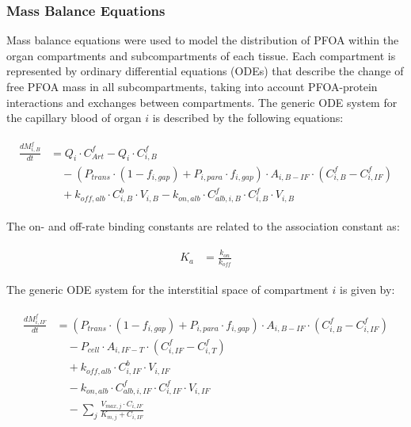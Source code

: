 \documentclass[preprint,12pt,authoryear]{elsarticle}
\begin{document}
\subsubsection{Mass Balance Equations}
Mass balance equations were used to model the distribution of PFOA within the organ compartments and subcompartments of each tissue. Each compartment is represented by ordinary differential equations (ODEs) that describe the change of free PFOA mass in all subcompartments, taking into account PFOA-protein interactions and exchanges between compartments. The generic ODE system for the capillary blood of organ $i$ is described by the following equations:

\begin{align}
\begin{aligned}
\frac{dM_{i,B}^f}{dt} &= Q_i \cdot C_{Art}^f 
- Q_i \cdot C_{i,B}^f \\
& \quad - (P_{trans}\cdot  (1-f_{i,gap}) + P_{i,para} \cdot f_{i,gap})  \cdot A_{i,B-IF} \cdot (C_{i,B}^f - C_{i,IF}^f) \\
& \quad + k_{off,alb} \cdot C_{i,B}^b \cdot V_{i,B} 
- k_{on,alb} \cdot C_{alb,i,B}^f \cdot C_{i,B}^f \cdot V_{i,B}
\end{aligned}
\label{eq:PFOA_blood_ODE_free_main}
\end{align}


The on- and off-rate binding constants are related to the association constant as:

\begin{align}
\begin{aligned}
K_a &= \frac{k_{on}}{k_{off}}
\end{aligned}
\label{eq:PFOA_association_constant_main}
\end{align}

The generic ODE system for the interstitial space of compartment $i$ is given by:

\begin{align}
\begin{aligned}
\frac{dM_{i,IF}^f}{dt} &= (P_{trans}\cdot  (1-f_{i,gap}) + P_{i,para} \cdot f_{i,gap}) \cdot A_{i,B-IF} \cdot (C_{i,B}^f - C_{i,IF}^f) \\ 
& \quad -  P_{cell} \cdot A_{i,IF-T} \cdot (C_{i,IF}^f - C_{i,T}^f) \\
& \quad + k_{off,alb} \cdot C_{i,IF}^b \cdot V_{i,IF} \\
& \quad - k_{on,alb} \cdot C_{alb,i,IF}^f \cdot C_{i,IF}^f \cdot V_{i,IF} \\
&  \quad - \sum_j \frac{V_{max,j} \cdot C_{i,IF}}{K_{m,j}+ C_{i,IF}}
\end{aligned}
\label{eq:PFOA_interstitial_ODE_free_main}
\end{align}
\end{document}
